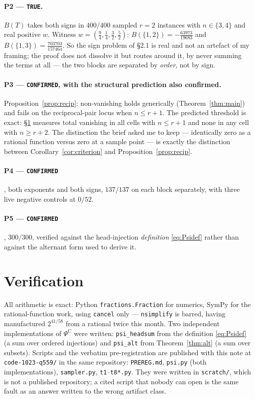 \documentclass[11pt]{article}
\theoremstyle{definition}
\newcommand{\PsiC}{\Psi^{\mathrm{C}}}
\begin{document}
\paragraph{P2 --- \texttt{TRUE}.} $B(T)$ takes both signs in $400/400$ sampled $r=2$
instances with $n\in\{3,4\}$ and real positive $w$. Witness
$w=(\tfrac94,\tfrac14,\tfrac32,\tfrac52)$:
$B(\{1,2\})=-\tfrac{63973}{19683}$ and $B(\{1,3\})=\tfrac{703703}{157464}$. So the sign
problem of \S2.1 is real and not an artefact of my framing; the proof does not dissolve it
but routes around it, by never summing the terms at all --- the two blocks are separated by
\emph{order}, not by sign.

\paragraph{P3 --- \texttt{CONFIRMED}, with the structural prediction also confirmed.}
Proposition~\ref{prop:recip}: non-vanishing holds generically (Theorem~\ref{thm:main}) and
fails on the reciprocal-pair locus when $n\le r+1$. The predicted threshold is exact:
\S\ref{sec:verif} measures total vanishing in all cells with $n\le r+1$ and none in any
cell with $n\ge r+2$. The distinction the brief asked me to keep --- identically zero as a
rational function versus zero at a sample point --- is exactly the distinction between
Corollary~\ref{cor:criterion} and Proposition~\ref{prop:recip}.

\paragraph{P4 --- \texttt{CONFIRMED}}, both exponents and both signs, $137/137$ on each
block separately, with three live negative controls at $0/52$.

\paragraph{P5 --- \texttt{CONFIRMED}}, $300/300$, verified against the head-injection
\emph{definition} \eqref{eq:Psidef} rather than against the alternant form used to derive
it.

\section{Verification}\label{sec:verif}

All arithmetic is exact: Python \texttt{fractions.Fraction} for numerics, SymPy for the
rational-function work, using \texttt{cancel} only --- \texttt{nsimplify} is barred, having
manufactured $2^{41/58}$ from a rational twice this month. Two independent implementations
of $\PsiC$ were written: \texttt{psi\_headsum} from the definition \eqref{eq:Psidef} (a sum
over ordered injections) and \texttt{psi\_alt} from Theorem~\ref{thm:alt} (a sum over
subsets). Scripts and the verbatim pre-registration are published with this note at \texttt{code-1023-q559/} in the same repository: \texttt{PREREG.md}, \texttt{psi.py} (both implementations), \texttt{sampler.py}, \texttt{t1}--\texttt{t8}\texttt{*.py}. They were written in \texttt{scratch/}, which is not a published repository; a cited script that nobody can open is the same fault as an answer written to the wrong artifact class.
\end{document}
